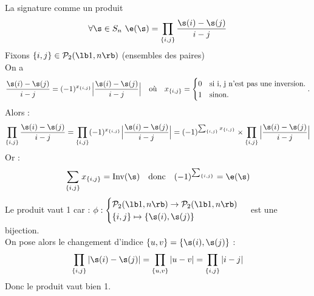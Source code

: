 \documentclass[11pt]{article}
\begin{document}
\begin{prop}{La signature comme un produit}{}
    \begin{equation*}
        \forall  \s \in S_{n} ~ \e(\s) = \prod_{\{i, j\}} \frac{\s(i) - \s(j) }{i - j}
    \end{equation*}
    \tcblower
    Fixons $\{i, j \} \in \mathcal{P}_{2}(\lb 1, n \rb)$ (ensembles des paires)\\
    On a 
    \begin{equation*}
        \frac{\s(i) - \s(j) }{i - j} = (-1)^{x_{\{i, j \}}} \Big|\frac{\s(i) - \s(j) }{i - j}\Big| \quad \text{où} \quad x_{\{i, j \}} = 
        \begin{cases}
            0 & \mbox{si {i, j} n'est pas une inversion.} \\
            1 & \mbox{sinon.}
        \end{cases}.
    \end{equation*}
    Alors :
    \begin{equation*}
        \prod_{\{i, j\}} \frac{\s(i) - \s(j) }{i - j} = \prod_{\{i, j\}} (-1)^{x_{\{i, j \}}} \Big|\frac{\s(i) - \s(j) }{i - j}\Big| = (-1)^{\sum_{\{i, j \}} x_{\{i, j \}}} \times \prod_{\{i, j\}} \Big|\frac{\s(i) - \s(j) }{i - j}\Big|
    \end{equation*}
    Or :
    \begin{equation*}
        \sum_{\{i, j \}} x_{\{i, j \}} = \text{Inv}(\s) \quad \text{donc} \quad (-1)^{\sum_{\{i, j \}}} = \e(\s)
    \end{equation*}
    Le produit vaut 1 car :
    $\phi : \begin{cases}
        \mathcal{P}_{2}(\lb 1, n \rb) \to \mathcal{P}_{2}(\lb 1, n \rb) \\
        \{ i, j \} \mapsto \{ \s(i), \s(j) \}
    \end{cases}$ est une bijection.\\
    On pose alors le changement d'indice $\{ u, v \} = \{ \s(i), \s(j) \}$ :
    \begin{equation*}
        \prod_{\{i, j\}} |\s(i) - \s(j)| = \prod_{\{u, v\}} |u - v| = \prod_{\{i, j\}} |i - j|
    \end{equation*}
    Donc le produit vaut bien 1.
\end{prop}
\end{document}
